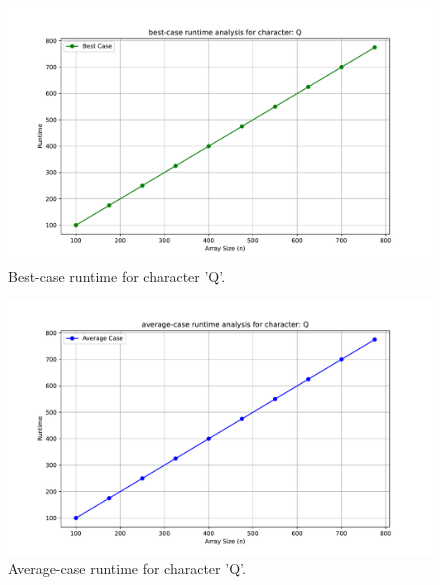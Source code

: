 \documentclass{article}
\begin{document}
        \begin{figure}[H]
		\centering
		\includegraphics[width=\textwidth]{runtime_analysis_best_Q.pdf}
		\caption{Best-case runtime for character 'Q'.}
	\end{figure}

        \begin{figure}[H]
		\centering
		\includegraphics[width=\textwidth]{runtime_analysis_average_Q.pdf}
		\caption{Average-case runtime for character 'Q'.}
	\end{figure}
\end{document}
